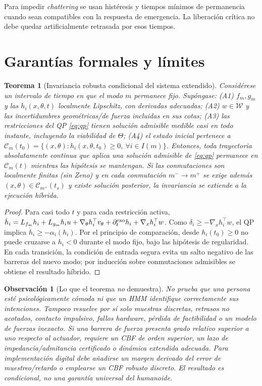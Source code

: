 \documentclass[10pt,a4paper,twocolumn]{article}
\newtheorem{theorem}{Teorema}
\newtheorem{remark}{Observación}
\newcommand{\calC}{\mathcal{C}}
\newcommand{\calW}{\mathcal{W}}
\begin{document}
Para impedir \emph{chattering} se usan histéresis y tiempos mínimos de permanencia cuando sean compatibles con la respuesta de emergencia. La liberación crítica no debe quedar artificialmente retrasada por esos tiempos.

\section{Garantías formales y límites}
\begin{theorem}[Invariancia robusta condicional del sistema extendido]
Considérese un intervalo de tiempo en que el modo $m$ permanece fijo. Supóngase: (A1) $f_m,g_m$ y las $h_i(x,\theta,t)$ localmente Lipschitz, con derivadas adecuadas; (A2) $w\in\calW$ y las incertidumbres geométricas/de fuerza incluidas en sus cotas; (A3) las restricciones del QP \eqref{eq:qp} tienen solución admisible medible casi en todo instante, incluyendo la viabilidad de $\Theta$; (A4) el estado inicial pertenece a
$\calC_m(t_0)=\{(x,\theta): h_i(x,\theta,t_0)\ge0,~\forall i\in I(m)\}$.
Entonces, toda trayectoria absolutamente continua que aplica una solución admisible de \eqref{eq:qp} permanece en $\calC_m(t)$ mientras las hipótesis se mantengan. Si las conmutaciones son localmente finitas (sin Zeno) y en cada conmutación $m^-\!\to m^+$ se exige además $(x,\theta)\in\calC_{m^+}(t_s)$ y existe solución posterior, la invariancia se extiende a la ejecución híbrida.
\label{thm:inv}
\end{theorem}
\begin{proof}
Para casi todo $t$ y para cada restricción activa,
$\dot h_i=L_{f_m}h_i+L_{g_m}h_i u+\nabla_\theta h_i^\top v_\theta+\partial_t^{\rm exo}h_i+\nabla_xh_i^\top w$.
Como $\delta_i\ge-\nabla_xh_i^\top w$, el QP implica $\dot h_i\ge-\alpha_i(h_i)$. Por el principio de comparación, desde $h_i(t_0)\ge0$ no puede cruzarse a $h_i<0$ durante el modo fijo, bajo las hipótesis de regularidad. En cada transición, la condición de entrada segura evita un salto negativo de las barreras del nuevo modo; por inducción sobre conmutaciones admisibles se obtiene el resultado híbrido.\qedhere
\end{proof}

\begin{remark}[Lo que el teorema \emph{no} demuestra]
No prueba que una persona esté psicológicamente cómoda ni que un HMM identifique correctamente sus intenciones. Tampoco resuelve por sí solo muestras discretas, retrasos no acotados, contacto impulsivo, fallos hardware, pérdida de factibilidad o un modelo de fuerzas inexacto. Si una barrera de fuerza presenta grado relativo superior a uno respecto al actuador, requiere un CBF de orden superior, un lazo de impedancia/admitancia certificado o dinámica extendida adecuada. Para implementación digital debe añadirse un margen derivado del error de muestreo/retardo o emplearse un CBF robusto discreto. El resultado es \emph{condicional}, no una garantía universal del humanoide.
\end{remark}
\end{document}
